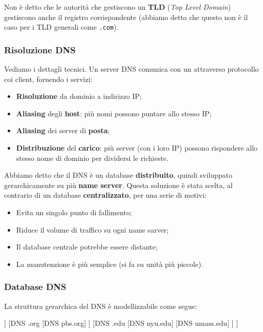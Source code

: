 \documentclass[a4paper,11pt]{article}
\begin{document}
Non è detto che le autorità che gestiscono un \textbf{TLD} (\textit{Top Level Domain}) gestiscono anche il registro corrispondente (abbiamo detto che questo non è il caso per i TLD generali come \lstinline|.com|).

\subsubsection{Risoluzione DNS}
Vediamo i dettagli tecnici.
Un server DNS comunica con un attraverso protocollo coi client, fornendo i servizi:
\begin{itemize}
	\item \textbf{Risoluzione} da dominio a indirizzo IP;
	\item \textbf{Aliasing} degli \textbf{host}: più nomi possono puntare allo stesso IP;
	\item \textbf{Aliasing} dei server di \textbf{posta};
	\item \textbf{Distribuzione} del \textbf{carico}: più server (con i loro IP) possono rispondere allo stesso nome di dominio per dividersi le richieste.
\end{itemize}

Abbiamo detto che il DNS è un database \textbf{distribuito}, quindi sviluppato gerarchicamente su più \textbf{name server}.
Questa soluzione è stata scelta, al contrario di un database \textbf{centralizzato}, per una serie di motivi:
\begin{itemize}
	\item Evita un singolo punto di fallimento;
	\item Riduce il volume di traffico su ogni name sarver;
	\item Il database centrale potrebbe essere distante;
	\item La manutenzione è più semplice (si fa su unità più piccole).
\end{itemize}

\subsubsection{Database DNS}
La struttura gerarchica del DNS è modellizzabile come segue:
\begin{center}
	\begin{forest}
		[DNS Root, rectstyle
		[DNS .com
			[DNS yahoo.com]
			[DNS google.com]
		]
		[DNS .org
			[DNS pbs.org]
		]
		[DNS .edu
			[DNS nyu.edu]
			[DNS umass.edu]
		]
		]	
	\end{forest}
\end{center}
\end{document}
